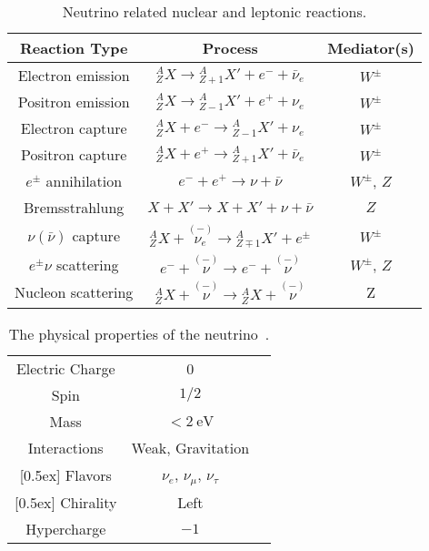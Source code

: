 \begin{table}[ht]
\centering
 \begin{tabular}{ c  c  c}
 \hline
 \hline
 Reaction Type & Process & Mediator(s)   \\
 \hline
 Electron emission & ${}^A_Z X \to {}^A_{Z+1}X' + e^- +\bar \nu_e$ & $W^{\pm}$  \\
 Positron emission & ${}^A_Z X \to {}^A_{Z-1}X' + e^+ + \nu_e$ & $W^{\pm}$  \\
 Electron capture & ${}^A_Z X + e^- \to {}^A_{Z-1}X'  + \nu_e$ &  $W^{\pm}$ \\
 Positron capture & ${}^A_Z X + e^+ \to {}^A_{Z+1}X'  + \bar\nu_e$ &  $W^{\pm}$ \\
 [0.5ex]
 \hline

 $e^{\pm}$ annihilation &  $e^- + e^+  \to \nu + \bar\nu $  & $W^{\pm}$, $Z$ \\
 Bremsstrahlung & $X+X' \to X + X' + \nu + \bar\nu$ & $Z$ \\
 [0.5ex]
 \hline

  $\nu (\bar\nu)$ capture & ${}^A_{Z}X + \overset{(-)}{\nu_e} \to {}^A_{Z\mp 1}X' + e^\pm $ & $W^{\pm}$\\
  [1ex]
 \hline
 $e^\pm\nu$ scattering & $e^- + \overset{(-)}{\nu} \to e^- + \overset{(-)}{\nu} $ &  $W^{\pm}$, $Z$ \\
 Nucleon scattering & $ {}^A_Z X + \overset{(-)}{\nu} \to {}^A_Z X + \overset{(-)}{\nu} $ &  Z\\
 [0.5ex]
 \hline
 \hline
 \end{tabular}
 \caption{Neutrino related nuclear and leptonic reactions.}
\label{table:Neutrino_Reactions}
\end{table}

\begin{table}[ht]
\centering
 \begin{tabular}{ c  c  c}
 \hline
 \hline
 [0.5ex]
  Electric Charge & 0\\
 [0.5ex]
  Spin & $1/2$ \\
 [0.5ex]
 Mass & $<2~\mathrm{eV}$ \\
 [0.5ex]
 Interactions & Weak, Gravitation  \\
 [0.5ex]
 Flavors & $\nu_e$, $\nu_\mu$, $\nu_\tau$ \\
 [0.5ex]
 Chirality & Left \\
 [0.5ex]
 Hypercharge & $-1$ \\
 [0.5ex]
 \hline
 \hline
 \end{tabular}
 \caption{The physical properties of the neutrino~\cite{Patrignani:2016xqp}.}
\label{table:neutrino-properties}
\end{table}

